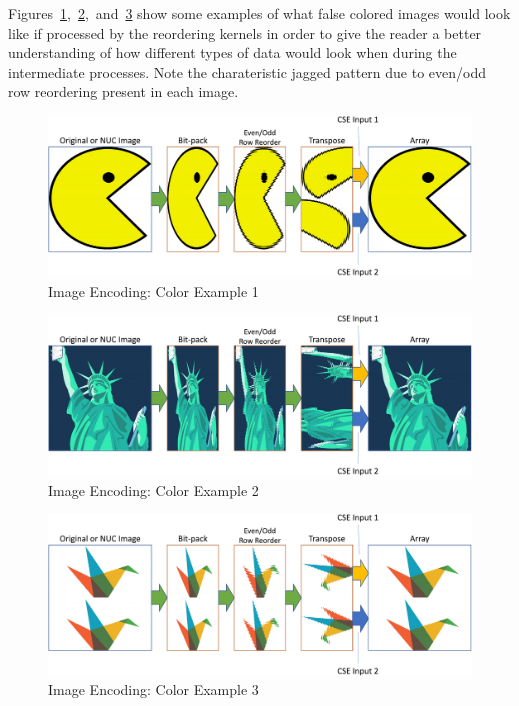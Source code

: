     Figures~\ref{fig:image_encoding_color_example1},~\ref{fig:image_encoding_color_example2},~and~\ref{fig:image_encoding_color_example3} show some examples of what false colored images would look like if processed by the reordering kernels in order to give the reader a better understanding of how different types of data would look when during the intermediate processes. Note the charateristic jagged pattern due to even/odd row reordering present in each image.

    \begin{figure}
        \centering
        \includegraphics[trim=0in 0in 0in 0in,width=1.0\textwidth]{fig/image_encoding_pac.pdf}
        \caption{Image Encoding: Color Example 1}
        \label{fig:image_encoding_color_example1}
    \end{figure}

    \begin{figure}
        \centering
        \includegraphics[trim=0in 0in 0in 0in,width=1.0\textwidth]{fig/image_encoding_liberty.pdf}
        \caption{Image Encoding: Color Example 2}
        \label{fig:image_encoding_color_example2}
    \end{figure}

    \begin{figure}
        \centering
        \includegraphics[trim=0in 0in 0in 0in,width=1.0\textwidth]{fig/image_encoding_origami.pdf}
        \caption{Image Encoding: Color Example 3}
        \label{fig:image_encoding_color_example3}
    \end{figure}

